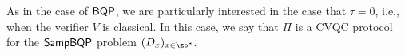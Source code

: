 As in the case of $\operatorname{\mathsf{BQP}}$, we are particularly interested in the case that $\tau = 0$, i.e., when the verifier $V$ is classical. In this case, we say that $\Pi$ is a CVQC protocol for the $\operatorname{\mathsf{SampBQP}}$ problem $(D_x)_{x\in\zo^*}$.



